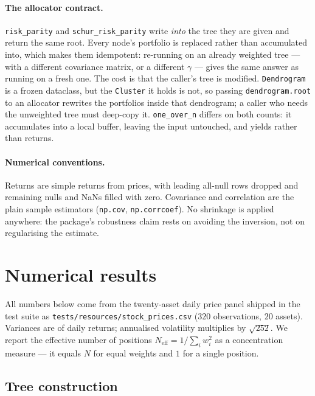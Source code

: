 \documentclass[11pt,a4paper]{article}
\newcommand{\code}[1]{\texttt{#1}}
\begin{document}
\paragraph{The allocator contract.}
\code{risk\_parity} and \code{schur\_risk\_parity} write \emph{into} the tree
they are given and return the same root. Every node's portfolio is replaced
rather than accumulated into, which makes them idempotent: re-running on an
already weighted tree --- with a different covariance matrix, or a different
$\gamma$ --- gives the same answer as running on a fresh one. The cost is that
the caller's tree is modified. \code{Dendrogram} is a frozen dataclass, but the
\code{Cluster} it holds is not, so passing \code{dendrogram.root} to an
allocator rewrites the portfolios inside that dendrogram; a caller who needs the
unweighted tree must deep-copy it. \code{one\_over\_n} differs on both counts:
it accumulates into a local buffer, leaving the input untouched, and yields
rather than returns.

\paragraph{Numerical conventions.}
Returns are simple returns from prices, with leading all-null rows dropped and
remaining nulls and NaNs filled with zero. Covariance and correlation are the
plain sample estimators (\code{np.cov}, \code{np.corrcoef}). No shrinkage is
applied anywhere: the package's robustness claim rests on avoiding the
inversion, not on regularising the estimate.

\section{Numerical results}
\label{sec:results}

All numbers below come from the twenty-asset daily price panel shipped in the
test suite as \code{tests/resources/stock\_prices.csv} ($320$ observations,
$20$ assets). Variances are of daily returns; annualised volatility multiplies
by $\sqrt{252}$. We report the effective number of positions
$N_{\mathrm{eff}} = 1 / \sum_i w_i^2$ as a concentration measure --- it equals
$N$ for equal weights and $1$ for a single position.

\subsection{Tree construction}
\end{document}
